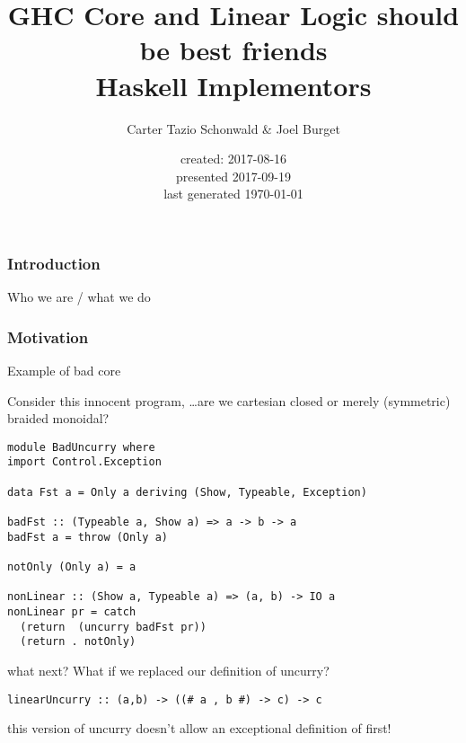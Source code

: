 \documentclass[11pt,reqno]{beamer}
\newcommand{\now}{\fullisodate
  \today  \usdate}
\begin{document}
\title{GHC Core and Linear Logic should be best friends \\ Haskell Implementors}
\author{Carter Tazio Schonwald \& Joel Burget}
\date{created: 2017-08-16\\ presented 2017-09-19 \\ last generated \now}

\maketitle

\begin{frame}
  \frametitle{Introduction}
  Who we are / what we do
\end{frame}

\begin{frame}
  \frametitle{Motivation}
  Example of bad core
\end{frame}

\begin{frame}[fragile]
Consider this innocent program, \ldots are we cartesian closed or merely (symmetric) braided monoidal?
\begin{verbatim}
module BadUncurry where
import Control.Exception

data Fst a = Only a deriving (Show, Typeable, Exception)

badFst :: (Typeable a, Show a) => a -> b -> a
badFst a = throw (Only a)

notOnly (Only a) = a

nonLinear :: (Show a, Typeable a) => (a, b) -> IO a
nonLinear pr = catch
  (return  (uncurry badFst pr))
  (return . notOnly)
\end{verbatim}

\end{frame}


\begin{frame}[fragile]
what next? What if we replaced our definition of uncurry?
\begin{verbatim}
linearUncurry :: (a,b) -> ((# a , b #) -> c) -> c
\end{verbatim}
this version of uncurry doesn't allow an exceptional definition of first!
\end{frame}
\end{document}
